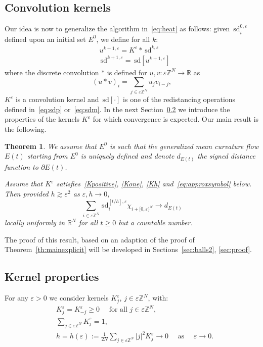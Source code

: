\documentclass[10pt]{amsart}
\theoremstyle{plain}
\newtheorem{theorem}{Theorem}[section]
\theoremstyle{definition}
\newcommand{\R}{\mathbb{R}}
\newcommand{\Z}{\mathbb{Z}}
\newcommand{\e}{\varepsilon}
\newcommand{\sd}{\,\mathrm{sd}}
\newcommand{\ez}{\e\Z^N}
\numberwithin{equation}{section}
\begin{document}
\subsection{Convolution kernels}
Our idea is now to generalize the algorithm in~\eqref{eq:heat} as follows: given
$\sd_i^{0,\e}$ defined upon an initial set $E^0$, we define for all $k$:
\begin{equation}\label{eq:defalgo}
  \begin{aligned}
    & u^{k+1,\e} = K^\e*\sd^{k,\e}\\
    & \sd^{k+1,\e} = \sd[u^{k+1,\e}]
  \end{aligned}
\end{equation}
where the discrete convolution $*$ is defined for $u,v:\ez\to\R$ as 
\[ 
(u * v)_i = \sum_{j\in\ez} u_j v_{i-j},
\]
$K^\e$ is a convolution kernel and
$\sd[\cdot]$ is one of the redistancing operations defined in~\eqref{eq:sdp} or~\eqref{eq:sdm}.
In the next Section~\ref{sec:Kernel}
we introduce the properties of the kernels $K^\e$
for which convergence is expected. 
Our main result is the following.
\begin{theorem}\label{th:variantexplicit}
  We assume that $E^0$ is such that the generalized mean curvature flow $E(t)$ starting from $E^0$
  is uniquely defined and denote $d_{E(t)}$ the signed distance function to $\partial E(t)$.
  
  Assume that $K^\e$ satisfies~\eqref{Kpositive}, \eqref{Kone}, \eqref{Kh} and~\eqref{eq:approxsymbol} below. 
  Then provided $h\gtrsim \e^2$ as $  {\e,h}\to 0$,
  \[
    \sum_{i\in\e\Z^N}\sd^{[t/h],\e}_i\chi_{i+[0,\e)^N} \to d_{E(t)}
  \]
  locally uniformly in $\R^N$ for all $t\ge 0$ but a countable number.
\end{theorem}
The proof of this result, based on an adaption of the proof of Theorem~\ref{th:mainexplicit} will
be developed in Sections~\ref{sec:balls2}, \ref{sec:proof}. 

\subsection{Kernel properties} \label{sec:Kernel}
For any $\e>0$ we consider  kernels $K_j^\e$, $j\in\e\Z^N$, with:
\begin{align}
  & \textstyle  K_j^\e= K_{-j}^\e \ge 0 \quad \text{ for all } j\in\e\Z^N, \label{Kpositive} \\
   & \textstyle \sum_{j\in\e\Z^N} K_j^\e=1, \label{Kone}\\
  & \textstyle h=h(\e):= \frac{1}{2N}\sum_{j\in\e\Z^N} |j|^2K_j^\e \to 0 \quad \text{  as } \quad  \e\to 0.  \label{Kh}  
\end{align}
\end{document}
